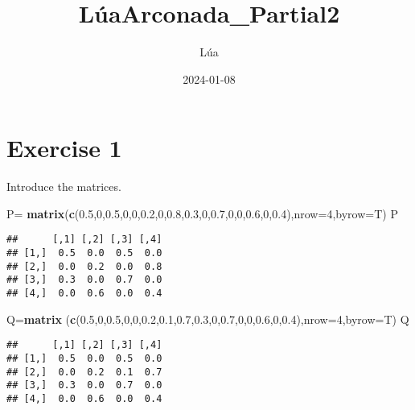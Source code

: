 \documentclass[
]{article}
\title{LúaArconada\_Partial2}
\author{Lúa}
\date{2024-01-08}
\newenvironment{Shaded}{\begin{snugshade}}{\end{snugshade}}
\newcommand{\AttributeTok}[1]{\textcolor[rgb]{0.13,0.29,0.53}{#1}}
\newcommand{\DecValTok}[1]{\textcolor[rgb]{0.00,0.00,0.81}{#1}}
\newcommand{\FloatTok}[1]{\textcolor[rgb]{0.00,0.00,0.81}{#1}}
\newcommand{\FunctionTok}[1]{\textcolor[rgb]{0.13,0.29,0.53}{\textbf{#1}}}
\newcommand{\NormalTok}[1]{#1}
\newcommand{\OtherTok}[1]{\textcolor[rgb]{0.56,0.35,0.01}{#1}}
\begin{document}
\maketitle

\hypertarget{exercise-1}{%
\section{Exercise 1}\label{exercise-1}}

Introduce the matrices.

\begin{Shaded}
\begin{Highlighting}[]
\NormalTok{P}\OtherTok{=} \FunctionTok{matrix}\NormalTok{(}\FunctionTok{c}\NormalTok{(}\FloatTok{0.5}\NormalTok{,}\DecValTok{0}\NormalTok{,}\FloatTok{0.5}\NormalTok{,}\DecValTok{0}\NormalTok{,}\DecValTok{0}\NormalTok{,}\FloatTok{0.2}\NormalTok{,}\DecValTok{0}\NormalTok{,}\FloatTok{0.8}\NormalTok{,}\FloatTok{0.3}\NormalTok{,}\DecValTok{0}\NormalTok{,}\FloatTok{0.7}\NormalTok{,}\DecValTok{0}\NormalTok{,}\DecValTok{0}\NormalTok{,}\FloatTok{0.6}\NormalTok{,}\DecValTok{0}\NormalTok{,}\FloatTok{0.4}\NormalTok{),}\AttributeTok{nrow=}\DecValTok{4}\NormalTok{,}\AttributeTok{byrow=}\NormalTok{T)}
\NormalTok{P}
\end{Highlighting}
\end{Shaded}

\begin{verbatim}
##      [,1] [,2] [,3] [,4]
## [1,]  0.5  0.0  0.5  0.0
## [2,]  0.0  0.2  0.0  0.8
## [3,]  0.3  0.0  0.7  0.0
## [4,]  0.0  0.6  0.0  0.4
\end{verbatim}

\begin{Shaded}
\begin{Highlighting}[]
\NormalTok{Q}\OtherTok{=}\FunctionTok{matrix}\NormalTok{ (}\FunctionTok{c}\NormalTok{(}\FloatTok{0.5}\NormalTok{,}\DecValTok{0}\NormalTok{,}\FloatTok{0.5}\NormalTok{,}\DecValTok{0}\NormalTok{,}\DecValTok{0}\NormalTok{,}\FloatTok{0.2}\NormalTok{,}\FloatTok{0.1}\NormalTok{,}\FloatTok{0.7}\NormalTok{,}\FloatTok{0.3}\NormalTok{,}\DecValTok{0}\NormalTok{,}\FloatTok{0.7}\NormalTok{,}\DecValTok{0}\NormalTok{,}\DecValTok{0}\NormalTok{,}\FloatTok{0.6}\NormalTok{,}\DecValTok{0}\NormalTok{,}\FloatTok{0.4}\NormalTok{),}\AttributeTok{nrow=}\DecValTok{4}\NormalTok{,}\AttributeTok{byrow=}\NormalTok{T)}
\NormalTok{Q}
\end{Highlighting}
\end{Shaded}

\begin{verbatim}
##      [,1] [,2] [,3] [,4]
## [1,]  0.5  0.0  0.5  0.0
## [2,]  0.0  0.2  0.1  0.7
## [3,]  0.3  0.0  0.7  0.0
## [4,]  0.0  0.6  0.0  0.4
\end{verbatim}
\end{document}
